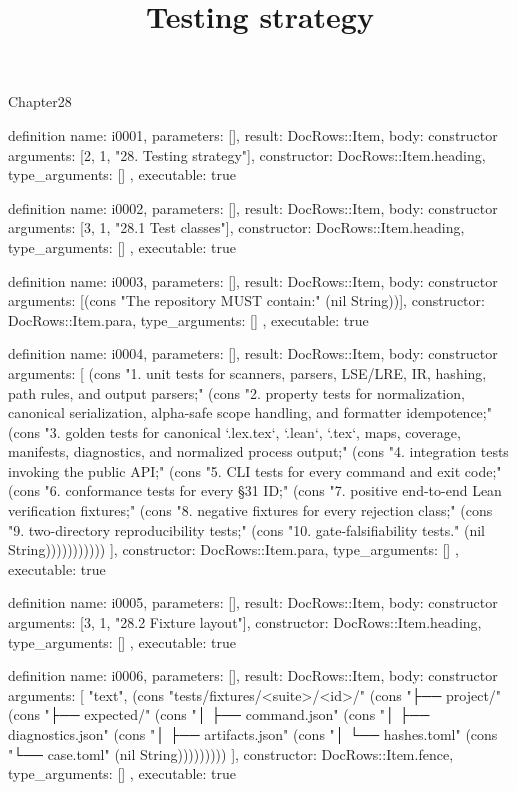 \begin{lexlean}{Chapter28}
\title{Testing strategy}
\begin{semanticmodule}
definition{
  name: i0001,
  parameters: [],
  result: DocRows::Item,
  body: constructor{
    arguments: [2, 1, "28. Testing strategy"],
    constructor: DocRows::Item.heading,
    type_arguments: []
  },
  executable: true
}

definition{
  name: i0002,
  parameters: [],
  result: DocRows::Item,
  body: constructor{
    arguments: [3, 1, "28.1 Test classes"],
    constructor: DocRows::Item.heading,
    type_arguments: []
  },
  executable: true
}

definition{
  name: i0003,
  parameters: [],
  result: DocRows::Item,
  body: constructor{
    arguments: [(cons "The repository MUST contain:" (nil String))],
    constructor: DocRows::Item.para,
    type_arguments: []
  },
  executable: true
}

definition{
  name: i0004,
  parameters: [],
  result: DocRows::Item,
  body: constructor{
    arguments: [
      (cons "1. unit tests for scanners, parsers, LSE/LRE, IR, hashing, path rules, and output parsers;" (cons "2. property tests for normalization, canonical serialization, alpha-safe scope handling, and formatter idempotence;" (cons "3. golden tests for canonical `.lex.tex`, `.lean`, `.tex`, maps, coverage, manifests, diagnostics, and normalized process output;" (cons "4. integration tests invoking the public API;" (cons "5. CLI tests for every command and exit code;" (cons "6. conformance tests for every §31 ID;" (cons "7. positive end-to-end Lean verification fixtures;" (cons "8. negative fixtures for every rejection class;" (cons "9. two-directory reproducibility tests;" (cons "10. gate-falsifiability tests." (nil String)))))))))))
    ],
    constructor: DocRows::Item.para,
    type_arguments: []
  },
  executable: true
}

definition{
  name: i0005,
  parameters: [],
  result: DocRows::Item,
  body: constructor{
    arguments: [3, 1, "28.2 Fixture layout"],
    constructor: DocRows::Item.heading,
    type_arguments: []
  },
  executable: true
}

definition{
  name: i0006,
  parameters: [],
  result: DocRows::Item,
  body: constructor{
    arguments: [
      "text",
      (cons "tests/fixtures/<suite>/<id>/" (cons "├── project/" (cons "├── expected/" (cons "│   ├── command.json" (cons "│   ├── diagnostics.json" (cons "│   ├── artifacts.json" (cons "│   └── hashes.toml" (cons "└── case.toml" (nil String)))))))))
    ],
    constructor: DocRows::Item.fence,
    type_arguments: []
  },
  executable: true
}


\end{semanticmodule}
\end{lexlean}
